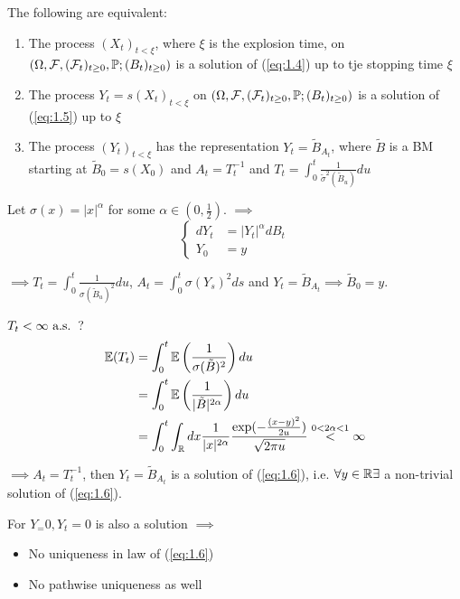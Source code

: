 \begin{theorem}\label{thm:1.23:weak_solution_1d}
    The following are equivalent:
    \begin{enumerate}
        \item The process $(X_t)_{t<\xi}$, where $\xi$ is the explosion time, on $(\Omega,\mathcal{F},(\mathcal{F}_t)_{t\geq 0},\mathbb{P};(B_t)_{t\geq 0})$ is a solution of (\ref{eq:1.4}) up to tje stopping time $\xi$
        \item The process $Y_t=s(X_t)_{t<\xi}$ on $(\Omega,\mathcal{F},(\mathcal{F}_t)_{t\geq 0},\mathbb{P};(B_t)_{t\geq 0})$ is a solution of (\ref{eq:1.5}) up to $\xi$
        \item The process $(Y_t)_{t<\xi}$ has the representation $Y_t=\tilde{B}_{A_t}$, where $\tilde{B}$ is a BM starting at $\tilde{B}_0=s(X_0)$ and $A_t=T_t^{-1}$ and $T_t=\int_0^t\frac{1}{\tilde{\sigma}^2(\tilde{B}_u)}du$
    \end{enumerate}    
\end{theorem}



Let $\sigma(x)=|x|^\alpha$ for some $\alpha\in \left(0,\frac{1}{2}\right)$.
$\implies$
\begin{equation}\label{eq:1.6}
    \begin{cases}
        dY_t &= |Y_t|^\alpha dB_t\\
        Y_0&=y
    \end{cases}
\end{equation}

$\implies T_t=\int_0^t\frac{1}{\sigma(\tilde{B}_u)^2}du$, $A_t=\int_0^t\sigma(Y_s)^2ds$ and $Y_t=\tilde{B}_{A_t}\implies \tilde{B}_0=y$.

$T_t<\infty\text{ a.s. }$?
\begin{align*}
    \mathbb{E}(T_t)&=\int_0^t \mathbb{E}\left(\frac{1}{\sigma(\tilde{B})^2}\right)du\\
    &=\int_0^t \mathbb{E}\left(\frac{1}{|\tilde{B}|^{2\alpha}}\right)du\\
    &=\int_0^t\int_{\mathbb{R}} dx \frac{1}{|x|^{2\alpha}}\frac{\exp(-\frac{(x-y)^2}{2u})}{\sqrt{2\pi u}}\stackrel{0<2\alpha<1}{<}\infty
\end{align*}

$\implies A_t=T_t^{-1}$, then $Y_t=\tilde{B}_{A_t}$ is a solution of (\ref{eq:1.6}),
i.e. $\forall y\in\mathbb{R}\exists$ a non-trivial solution of (\ref{eq:1.6}).

For $Y_=0,Y_t=0$ is also a solution $\implies$
\begin{itemize}
    \item No uniqueness in law of (\ref{eq:1.6})
    \item No pathwise uniqueness as well
\end{itemize}

